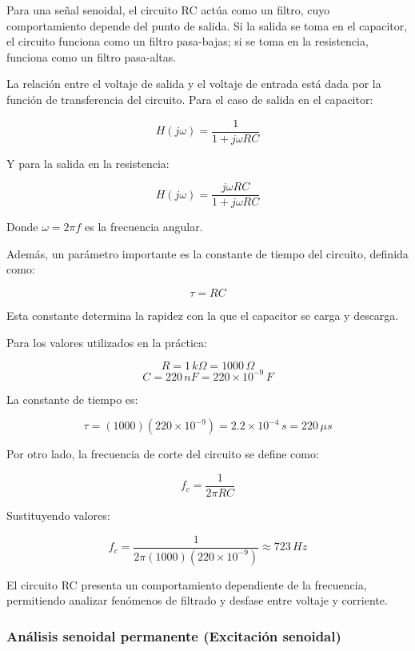 \documentclass[letter,11pt]{article}
\begin{document}
			\hspace{0.5cm}Para una señal senoidal, el circuito RC actúa como un filtro, cuyo comportamiento depende del punto de salida. Si la salida se toma en el capacitor, el circuito funciona como un filtro pasa-bajas; si se toma en la resistencia, funciona como un filtro pasa-altas.
			
			\hspace{0.5cm}La relación entre el voltaje de salida y el voltaje de entrada está dada por la función de transferencia del circuito. Para el caso de salida en el capacitor:
			
			\[
			H(j\omega) = \frac{1}{1 + j\omega RC}
			\]
			
			Y para la salida en la resistencia:
			
			\[
			H(j\omega) = \frac{j\omega RC}{1 + j\omega RC}
			\]
			
			Donde $\omega = 2\pi f$ es la frecuencia angular.
			
			Además, un parámetro importante es la constante de tiempo del circuito, definida como:
			
			\[
			\tau = RC
			\]
			
			Esta constante determina la rapidez con la que el capacitor se carga y descarga.
			
			Para los valores utilizados en la práctica:
			
			\[
			R = 1\,k\Omega = 1000\,\Omega
			\]
			\[
			C = 220\,nF = 220 \times 10^{-9}\,F
			\]
			
			La constante de tiempo es:
			
			\[
			\tau = (1000)(220 \times 10^{-9}) = 2.2 \times 10^{-4}\,s = 220\,\mu s
			\]
			
			Por otro lado, la frecuencia de corte del circuito se define como:
			
			\[
			f_c = \frac{1}{2\pi RC}
			\]
			
			Sustituyendo valores:
			
			\[
			f_c = \frac{1}{2\pi (1000)(220 \times 10^{-9})} \approx 723\,Hz
			\]
			
			\hspace{0.5cm}El circuito RC presenta un comportamiento dependiente de la frecuencia, permitiendo analizar fenómenos de filtrado y desfase entre voltaje y corriente.
		
		\subsubsection{Análisis senoidal permanente (Excitación senoidal)}
		
\end{document}
